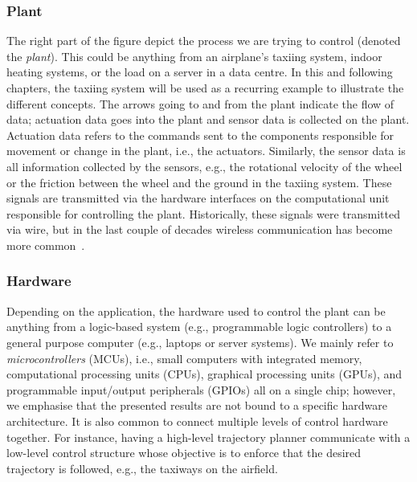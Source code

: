 \subsubsection{Plant}%
%
The right part of the figure depict the process we are trying to control (denoted the \emph{plant}).
This could be anything from an airplane's taxiing system, indoor heating systems, or the load on a server in a data centre.
In this and following chapters, the taxiing system will be used as a recurring example to illustrate the different concepts.
The arrows going to and from the plant indicate the flow of data; actuation data goes into the plant and sensor data is collected on the plant.
Actuation data refers to the commands sent to the components responsible for movement or change in the plant, i.e., the actuators.
Similarly, the sensor data is all information collected by the sensors, e.g., the rotational velocity of the wheel or the friction between the wheel and the ground in the taxiing system.
These signals are transmitted via the hardware interfaces on the computational unit responsible for controlling the plant.
Historically, these signals were transmitted via wire, but in the last couple of decades wireless communication has become more common~\addref{}.


\subsubsection{Hardware}%
%
Depending on the application, the hardware used to control the plant can be anything from a logic-based system (e.g., programmable logic controllers) to a general purpose computer (e.g., laptops or server systems).
We mainly refer to \emph{microcontrollers} (MCUs), i.e., small computers with integrated memory, computational processing units (CPUs), graphical processing units (GPUs), and programmable input/output peripherals (GPIOs) all on a single chip; however, we emphasise that the presented results are not bound to a specific hardware architecture.
It is also common to connect multiple levels of control hardware together.
For instance, having a high-level trajectory planner communicate with a low-level control structure whose objective is to enforce that the desired trajectory is followed, e.g., the taxiways on the airfield.

